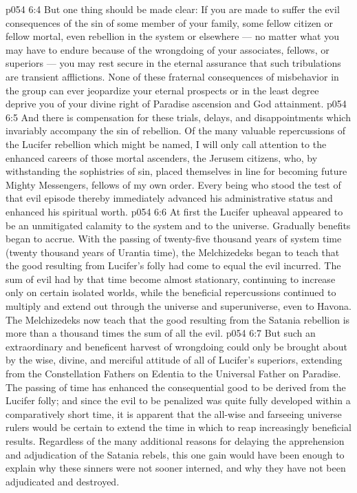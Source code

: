\vs p054 6:4 But one thing should be made clear: If you are made to suffer the evil consequences of the sin of some member of your family, some fellow citizen or fellow mortal, even rebellion in the system or elsewhere --- no matter what you may have to endure because of the wrongdoing of your associates, fellows, or superiors --- you may rest secure in the eternal assurance that such tribulations are transient afflictions. None of these fraternal consequences of misbehavior in the group can ever jeopardize your eternal prospects or in the least degree deprive you of your divine right of Paradise ascension and God attainment.
\vs p054 6:5 And there is compensation for these trials, delays, and disappointments which invariably accompany the sin of rebellion. Of the many valuable repercussions of the Lucifer rebellion which might be named, I will only call attention to the enhanced careers of those mortal ascenders, the Jerusem citizens, who, by withstanding the sophistries of sin, placed themselves in line for becoming future Mighty Messengers, fellows of my own order. Every being who stood the test of that evil episode thereby immediately advanced his administrative status and enhanced his spiritual worth.
\vs p054 6:6 \pc At first the Lucifer upheaval appeared to be an unmitigated calamity to the system and to the universe. Gradually benefits began to accrue. With the passing of twenty\hyp{}five thousand years of system time (twenty thousand years of Urantia time), the Melchizedeks began to teach that the good resulting from Lucifer’s folly had come to equal the evil incurred. The sum of evil had by that time become almost stationary, continuing to increase only on certain isolated worlds, while the beneficial repercussions continued to multiply and extend out through the universe and superuniverse, even to Havona. The Melchizedeks now teach that the good resulting from the Satania rebellion is more than a thousand times the sum of all the evil.
\vs p054 6:7 But such an extraordinary and beneficent harvest of wrongdoing could only be brought about by the wise, divine, and merciful attitude of all of Lucifer’s superiors, extending from the Constellation Fathers on Edentia to the Universal Father on Paradise. The passing of time has enhanced the consequential good to be derived from the Lucifer folly; and since the evil to be penalized was quite fully developed within a comparatively short time, it is apparent that the all\hyp{}wise and farseeing universe rulers would be certain to extend the time in which to reap increasingly beneficial results. Regardless of the many additional reasons for delaying the apprehension and adjudication of the Satania rebels, this one gain would have been enough to explain why these sinners were not sooner interned, and why they have not been adjudicated and destroyed.
